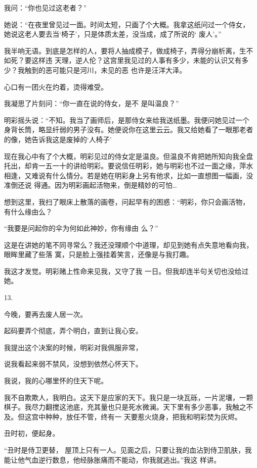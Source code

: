 \documentclass{article}
\begin{document}
我问：“你也见过这老者？” 

她说：“在夜里曾见过一面。时间太短，只画了个大概。我拿这纸问过一个侍女，她说这老人要去当‘椅子’，只是体质太差，没当成，成了所说的‘
废人’。” 

我半响无语。到底是怎样的人，要将人抽成模子，做成椅子，弄得分崩析离，生不如死？要这样违
\newpage
天理，逆人伦？这宫里我见过的人事有多少，未能的认识又有多少？我触到的恶可能只是河川，未见的恶
也许是汪洋大泽。 


心口有一团火在灼着，烫得难受。 

我凝思了片刻问：“你一直在说的侍女，是不
是叫温良？” 

明彩摇头说：“不知。我当了画师后，是那侍女来给我送纸墨。我便问她见过一个身背长筒，略显纤弱的男子没有。她便说你在这里云云。我又给她看了一眼那老者的像，她告诉我这是废掉的‘人椅子’

现在我心中有了个大概，明彩见过的侍女定是温良。但温良不肯把她所知向我全盘托出，却肯一五一十的讲给明彩。要说信任明彩，她与明彩也不过一面之缘，萍水相逢，又难说有什么情分。若是她在明彩身上另有他求，比如一直想图一幅画，没准倒还说
得通。因为明彩画起活物来，倒是精妙的可怕… 

\newpage

想到这里，我扫了眼床上散落的画卷，问起早有的困惑：“明彩，你只会画活物，有什么缘由么？

“我要是问起你的伞为何如此神妙，你有缘由
么？” 

这是在讲她的笔不同寻常么？我还没理顺个中道理，却见到她有点失意地看向我，眼眸里藏了些落
寞，只是脸上强挂着笑言，还像是与我打趣。 

我这才发觉。明彩赌上性命来见我，又守了我
一日。但我却连半句关切也没给过她。 


13. 


今晚，要再去废人居一次。 

起码要弄个彻底，弄个明白，直到让我心安。

我提出这个决案的时候，明彩对我佩服非常，

\newpage
说我看起来弱不禁风，没想到依然心怀天下。 


我说，我的心哪里怀的住天下呢。 

我不自欺欺人，我明白。这天下是应家的天下。我只是一块瓦砾，一片泥壤，一颗棋子。我尽力翻搅这池底，充其量也只是死水微澜。天下里有多少恶事，我触之不及。但这宫中种种，放任不管，终有一
天要惹火烧身，把我和明彩焚为灰烬。 


丑时初，便起身。 

“丑时是侍卫更替， 屋顶上只有一人。见面之后，只要让我的血沾到侍卫肌肤，我能让他气血逆行数息，他经脉胀痛而不能动，你我就逃出。”我这
样讲。 
\end{document}
